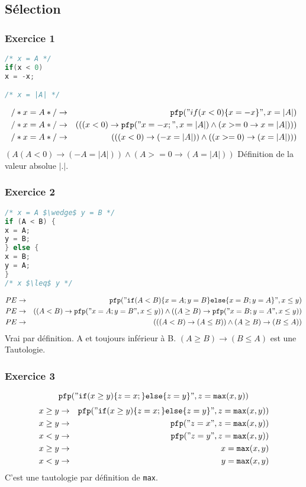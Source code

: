 \subsection{Sélection} \label{pfpSequence}
\subsubsection{Exercice 1}
\begin{lstlisting}[language=C]
/* x = A */
if(x < 0)
x = -x;

/* x = |A| */
\end{lstlisting}

\begin{eqnarray*}
/*x = A*/ &\rightarrow& \pfp ("if(x < 0)\{ x = -x \}", x = |A|)\\
/*x = A*/ &\rightarrow& (((x<0)\rightarrow \pfp ("x=-x;", x = |A| ) \wedge (x >= 0 \rightarrow x = |A|)))\\
/*x = A*/ &\rightarrow& (((x < 0) \rightarrow (-x = |A|)) \wedge (( x >= 0) \rightarrow (x = |A|)))\\
\end{eqnarray*}
$( A ( A < 0) \rightarrow (-A = |A|) ) \wedge (A >= 0 \rightarrow (A=|A|))$
Définition de la valeur absolue $|.|$.

\subsubsection{Exercice 2}
\begin{lstlisting}[language=C]
/* x = A $\wedge$ y = B */
if (A < B) {
x = A;
y = B;
} else {
x = B;
y = A;
}
/* x $\leq$ y */ 
\end{lstlisting}
\begin{eqnarray*}
PE &\rightarrow& \pfp ("\ifp (A < B) \{ x = A; y = B\}\elsep \{ x = B; y =A\}", x \leq y)\\
PE&\rightarrow&((A<B)\rightarrow\pfp("x=A;y=B",x\leq y))\wedge((A\geq B)\rightarrow\pfp("x=B;y=A",x\leq y))\\
PE &\rightarrow& ((( A < B) \rightarrow (A \leq B)) \wedge (A \geq B ) \rightarrow (B \leq A))
\end{eqnarray*}
Vrai par définition. A et toujours inférieur à B. $(A \geq B) \rightarrow (B \leq A)$ est une Tautologie. 
\subsubsection{Exercice 3}
$$\pfp ("\ifp (x \geq y )\{z=x;\}\elsep\{z=y\}",z=\texttt{max}(x,y))$$
\begin{eqnarray*}
x \geq y  &\rightarrow&	\pfp ("\ifp (x \geq y )\{z=x;\}\elsep\{z=y\}",z=\texttt{max}(x,y))\\
x \geq y &\rightarrow& \pfp ("z = x", z = \texttt{max}(x,y))\\
x < y &\rightarrow& \pfp ("z = y", z = \texttt{max}(x,y))\\
x \geq y &\rightarrow& x = \texttt{max}(x,y)\\
x < y &\rightarrow& y = \texttt{max}(x,y)
\end{eqnarray*}
C'est une tautologie par définition de \texttt{max}.

